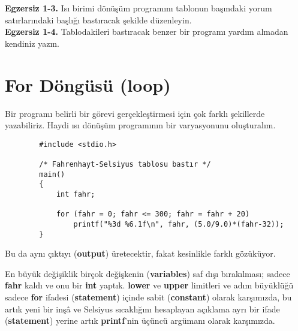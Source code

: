 \documentclass[a4paper,12pt,oneside]{book}
\begin{document}
\noindent \textbf{Egzersiz 1-3.} Isı birimi dönüşüm programını tablonun başındaki yorum satırlarındaki başlığı bastıracak şekilde düzenleyin. \\


\noindent \textbf{Egzersiz 1-4.} Tablodakileri bastıracak benzer bir programı yardım almadan kendiniz yazın.

\section{For Döngüsü (loop)}

\par Bir programı belirli bir görevi gerçekleştirmesi için çok farklı şekillerde yazabiliriz. Haydi ısı dönüşüm programının bir varyasyonunu oluşturalım.

\begin{lstlisting}
		#include <stdio.h>

        /* Fahrenhayt-Selsiyus tablosu bastır */
        main()
        {
            int fahr;

            for (fahr = 0; fahr <= 300; fahr = fahr + 20)
                printf("%3d %6.1f\n", fahr, (5.0/9.0)*(fahr-32));
        }
\end{lstlisting}

Bu da aynı çıktıyı (\textbf{output}) üretecektir, fakat kesinlikle farklı gözüküyor.

\pagebreak En büyük değişiklik birçok değişkenin (\textbf{variables}) saf dışı bırakılması; sadece \textbf{fahr} kaldı ve onu bir \textbf{int} yaptık. \textbf{lower} ve \textbf{upper} limitleri ve adım büyüklüğü sadece \textbf{for} ifadesi (\textbf{statement}) içinde sabit (\textbf{constant}) olarak karşımızda, bu artık yeni bir inşâ ve Selsiyus sıcaklığını hesaplayan açıklama ayrı bir ifade (\textbf{statement}) yerine artık \textbf{printf}'nin üçüncü argümanı  olarak karşımızda.
\end{document}
